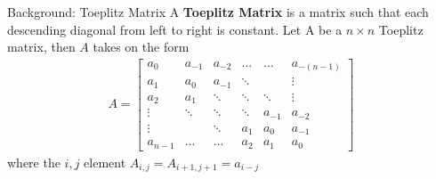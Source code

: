 \documentclass{beamer}
\begin{document}

\begin{frame}{Background: Toeplitz Matrix}
	A \textbf{Toeplitz Matrix} is a matrix such that each descending diagonal from left to right is constant. Let A be a $n \times n$ Toeplitz matrix, then $A$ takes on the form
	\begin{align*}
		A =
		\begin{bmatrix}
			a_0     & a_{-1} & a_{-2}  & \dots  & \dots  & a_{-(n-1)} \\
			a_1     & a_0    & a_{-1}  & \ddots &        & \vdots     \\
			a_2     & a_1    & \ddots  & \ddots & \ddots & \vdots     \\
			\vdots  & \ddots & \ddots  & \ddots & a_{-1} & a_{-2}     \\
			\vdots  &        & \ddots  & a_1    & a_0    & a_{-1}     \\
			a_{n-1} & \dots  & \dots   & a_2    & a_1    & a_0
		\end{bmatrix}
	\end{align*}
	where the $i,j$ element $A_{i,j} = A_{i+1,j+1} = a_{i-j}$
\end{frame}

\end{document}
